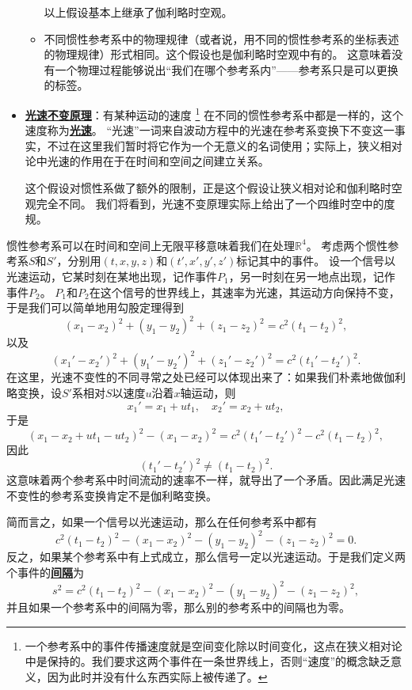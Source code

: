 \documentclass[hyperref, UTF8, a4paper]{ctexart}
\newcommand*{\concept}[1]{\underline{\textbf{#1}}}
\begin{document}
\begin{itemize}
\begin{itemize}
        以上假设基本上继承了伽利略时空观。
        \item 不同惯性参考系中的物理规律（或者说，用不同的惯性参考系的坐标表述的物理规律）形式相同。这个假设也是伽利略时空观中有的。
        这意味着没有一个物理过程能够说出“我们在哪个参考系内”——参考系只是可以更换的标签。
    \end{itemize}
    \item \concept{光速不变原理}：有某种运动的速度%
    \footnote{
        一个参考系中的事件传播速度就是空间变化除以时间变化，这点在狭义相对论中是保持的。我们要求这两个事件在一条世界线上，否则“速度”的概念缺乏意义，因为此时并没有什么东西实际上被传递了。
    }%
    在不同的惯性参考系中都是一样的，这个速度称为\concept{光速}。
    “光速”一词来自波动方程中的光速在参考系变换下不变这一事实，不过在这里我们暂时将它作为一个无意义的名词使用；实际上，狭义相对论中光速的作用在于在时间和空间之间建立关系。
    
    这个假设对惯性系做了额外的限制，正是这个假设让狭义相对论和伽利略时空观完全不同。
    我们将看到，光速不变原理实际上给出了一个四维时空中的度规。
\end{itemize}

惯性参考系可以在时间和空间上无限平移意味着我们在处理$\mathbb{R}^4$。
考虑两个惯性参考系$S$和$S'$，分别用$(t, x, y, z)$和$(t', x', y', z')$标记其中的事件。
设一个信号以光速运动，它某时刻在某地出现，记作事件$P_1$，另一时刻在另一地点出现，记作事件$P_2$。
$P_1$和$P_2$在这个信号的世界线上，其速率为光速，其运动方向保持不变，于是我们可以简单地用勾股定理得到
\[
    (x_1 - x_2)^2 + (y_1 - y_2)^2 + (z_1 - z_2)^2 = c^2 (t_1 - t_2)^2, 
\]
以及
\[
    (x_1' - x_2')^2 + (y_1' - y_2')^2 + (z_1' - z_2')^2 = c^2 (t_1' - t_2')^2.
\]
在这里，光速不变性的不同寻常之处已经可以体现出来了：如果我们朴素地做伽利略变换，设$S'$系相对$S$以速度$u$沿着$x$轴运动，则
\[
    x_1' = x_1 + u t_1, \quad x_2' = x_2 + u t_2,
\]
于是
\[
    (x_1 - x_2 + u t_1 - u t_2)^2 - (x_1 - x_2)^2 = c^2 (t_1' - t_2')^2 - c^2 (t_1 - t_2)^2,
\]
因此
\[
    (t_1' - t_2')^2 \neq (t_1 - t_2)^2.
\]
这意味着两个参考系中时间流动的速率不一样，就导出了一个矛盾。因此满足光速不变性的参考系变换肯定不是伽利略变换。

简而言之，如果一个信号以光速运动，那么在任何参考系中都有
\[
    c^2 (t_1 - t_2)^2 - (x_1 - x_2)^2 - (y_1 - y_2)^2 - (z_1 - z_2)^2 = 0.    
\]
反之，如果某个参考系中有上式成立，那么信号一定以光速运动。于是我们定义两个事件的\concept{间隔}为
\begin{equation}
    s^2 = c^2 (t_1 - t_2)^2 - (x_1 - x_2)^2 - (y_1 - y_2)^2 - (z_1 - z_2)^2,
\end{equation}
并且如果一个参考系中的间隔为零，那么别的参考系中的间隔也为零。
\end{document}
